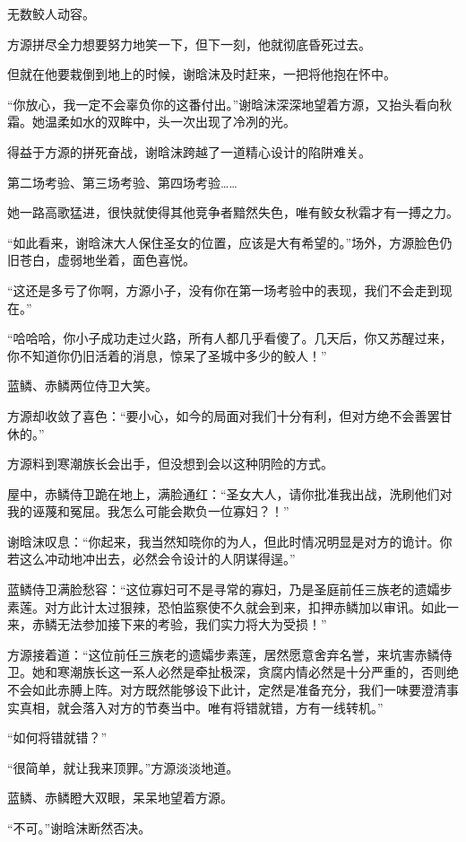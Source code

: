 \begin{this_body}
无数鲛人动容。

方源拼尽全力想要努力地笑一下，但下一刻，他就彻底昏死过去。

但就在他要栽倒到地上的时候，谢晗沫及时赶来，一把将他抱在怀中。

“你放心，我一定不会辜负你的这番付出。”谢晗沫深深地望着方源，又抬头看向秋霜。她温柔如水的双眸中，头一次出现了冷冽的光。

得益于方源的拼死奋战，谢晗沫跨越了一道精心设计的陷阱难关。

第二场考验、第三场考验、第四场考验……

她一路高歌猛进，很快就使得其他竞争者黯然失色，唯有鲛女秋霜才有一搏之力。

“如此看来，谢晗沫大人保住圣女的位置，应该是大有希望的。”场外，方源脸色仍旧苍白，虚弱地坐着，面色喜悦。

“这还是多亏了你啊，方源小子，没有你在第一场考验中的表现，我们不会走到现在。”

“哈哈哈，你小子成功走过火路，所有人都几乎看傻了。几天后，你又苏醒过来，你不知道你仍旧活着的消息，惊呆了圣城中多少的鲛人！”

蓝鳞、赤鳞两位侍卫大笑。

方源却收敛了喜色：“要小心，如今的局面对我们十分有利，但对方绝不会善罢甘休的。”

方源料到寒潮族长会出手，但没想到会以这种阴险的方式。

屋中，赤鳞侍卫跪在地上，满脸通红：“圣女大人，请你批准我出战，洗刷他们对我的诬蔑和冤屈。我怎么可能会欺负一位寡妇？！”

谢晗沫叹息：“你起来，我当然知晓你的为人，但此时情况明显是对方的诡计。你若这么冲动地冲出去，必然会令设计的人阴谋得逞。”

蓝鳞侍卫满脸愁容：“这位寡妇可不是寻常的寡妇，乃是圣庭前任三族老的遗孀步素莲。对方此计太过狠辣，恐怕监察使不久就会到来，扣押赤鳞加以审讯。如此一来，赤鳞无法参加接下来的考验，我们实力将大为受损！”

方源接着道：“这位前任三族老的遗孀步素莲，居然愿意舍弃名誉，来坑害赤鳞侍卫。她和寒潮族长这一系人必然是牵扯极深，贪腐内情必然是十分严重的，否则绝不会如此赤膊上阵。对方既然能够设下此计，定然是准备充分，我们一味要澄清事实真相，就会落入对方的节奏当中。唯有将错就错，方有一线转机。”

“如何将错就错？”

“很简单，就让我来顶罪。”方源淡淡地道。

蓝鳞、赤鳞瞪大双眼，呆呆地望着方源。

“不可。”谢晗沫断然否决。

\end{this_body}

